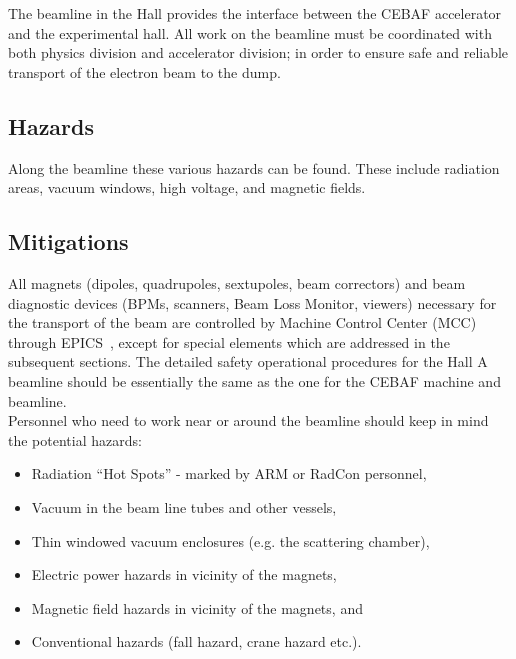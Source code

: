 \begin{safetyen}{0}{0}
%
%

The beamline in the Hall provides the interface between the CEBAF accelerator
and the experimental hall.   All work on the beamline must be coordinated 
with both physics division and accelerator division; in order to ensure
safe and reliable transport of the electron beam to the dump.

\subsection{Hazards}

Along the beamline these various hazards can be found.  These include
radiation areas, vacuum windows, high voltage, and magnetic fields.

\subsection{Mitigations}

All magnets (dipoles, quadrupoles, sextupoles, beam correctors) and beam 
diagnostic devices (BPMs, scanners, Beam Loss Monitor, viewers) necessary for 
the transport of the beam are controlled by Machine Control Center (MCC) 
through EPICS~\cite{EPICSwww}, except for special elements which are addressed in the 
subsequent sections. The detailed safety operational procedures for the Hall 
A beamline should be essentially the same as the one for the CEBAF machine 
and beamline.\\ 
  
\noindent{}Personnel who need to work near or around the beamline should keep in mind the potential hazards:
\begin{itemize}
  \item Radiation ``Hot Spots'' - marked by ARM or RadCon personnel,
  \item Vacuum in the beam line tubes and other vessels,
  \item Thin windowed vacuum enclosures (e.g. the scattering chamber),
  \item Electric power hazards in vicinity of the magnets,
  \item Magnetic field hazards in vicinity of the magnets, and
  \item Conventional hazards (fall hazard, crane hazard etc.).
\end{itemize}


\end{safetyen}
